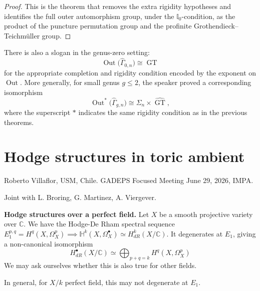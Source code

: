 \begin{proof}
This is the theorem that removes the extra
rigidity hypotheses and identifies the full
outer automorphism group, under the
\(\mathbb{I}_0\)-condition, as the product of
the puncture permutation group and the
profinite Grothendieck--Teichm\"uller group.
\end{proof}

\medskip\noindent
There is also a slogan in the genus-zero
setting:
$$
\operatorname{Out}\bigl(\widehat{\Gamma}_{0,n}\bigr)
\cong \widehat{\operatorname{GT}}
$$
for the appropriate completion and rigidity
condition encoded by the exponent on
\(\operatorname{Out}\). More generally, for
small genus \(g\leq 2\), the speaker proved a
corresponding isomorphism
$$
\operatorname{Out}^{\ast}\bigl(\widehat{\Gamma}_{g,n}\bigr)
\cong
\Sigma_n \times \widehat{\operatorname{GT}},
$$
where the superscript \(\ast\) indicates the
same rigidity condition as in the previous
theorems.

\section{Hodge structures in toric ambient}
\label{section-hodge-structures-toric-ambient}

\noindent
Roberto Villaflor, USM, Chile.
GADEPS Focused Meeting June 29, 2026, IMPA.

\medskip\noindent
Joint with L. Broring, G. Martinez,
A. Viergever.

\medskip\noindent
{\bf Hodge structures over a perfect
field.} Let $X$ be a smooth
projective variety over $\mathbb{C}$.
We have the Hodge-De Rham spectral sequence
$E^{p,q}_1=H^q(X,\Omega_X^p) 
\implies \mathbb{H}^k(X,\Omega_X^\bullet)
\simeq H^k_{dR}(X/\mathbb{C})$.
It degenerates at $E_1$, giving
a non-canonical isomorphism
$$
H^\bullet_{dR}(X/\mathbb{C})
\simeq
\bigoplus_{p+q=k}H^q(X,\Omega_X^p)
$$
We may ask ourselves whether this is also
true for other fields.

\begin{remark}
\label{remark-derham-to-hodge-not-degenerate}
In general, for $X/k$ perfect field,
this may not degenerate at $E_1$.
\end{remark}

